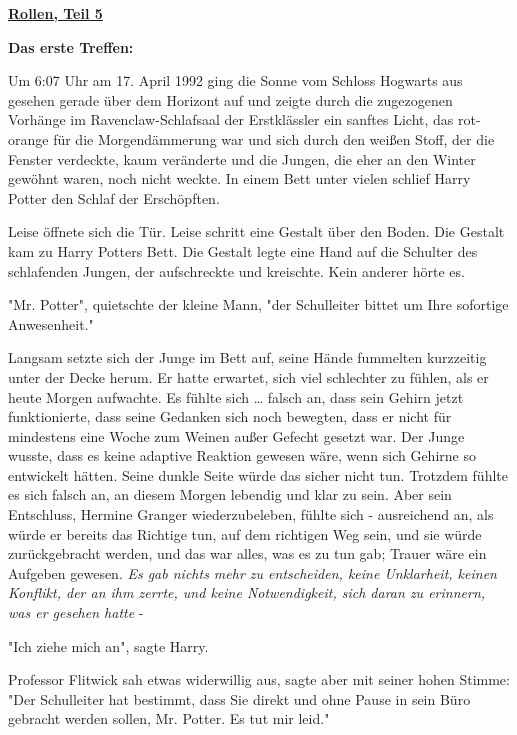 

\hypertarget{rollen-teil-5}{%

\textbf{\uline{Rollen, Teil 5}}

\textbf{Das erste Treffen:}

Um 6:07 Uhr am 17. April 1992 ging die Sonne vom Schloss Hogwarts aus gesehen gerade über dem Horizont auf und zeigte durch die zugezogenen Vorhänge im Ravenclaw-Schlafsaal der Erstklässler ein sanftes Licht, das rot-orange für die Morgendämmerung war und sich durch den weißen Stoff, der die Fenster verdeckte, kaum veränderte und die Jungen, die eher an den Winter gewöhnt waren, noch nicht weckte. In einem Bett unter vielen schlief Harry Potter den Schlaf der Erschöpften.

Leise öffnete sich die Tür. Leise schritt eine Gestalt über den Boden. Die Gestalt kam zu Harry Potters Bett. Die Gestalt legte eine Hand auf die Schulter des schlafenden Jungen, der aufschreckte und kreischte. Kein anderer hörte es.

"Mr. Potter", quietschte der kleine Mann, "der Schulleiter bittet um Ihre sofortige Anwesenheit."

Langsam setzte sich der Junge im Bett auf, seine Hände fummelten kurzzeitig unter der Decke herum. Er hatte erwartet, sich viel schlechter zu fühlen, als er heute Morgen aufwachte. Es fühlte sich … falsch an, dass sein Gehirn jetzt funktionierte, dass seine Gedanken sich noch bewegten, dass er nicht für mindestens eine Woche zum Weinen außer Gefecht gesetzt war. Der Junge wusste, dass es keine adaptive Reaktion gewesen wäre, wenn sich Gehirne so entwickelt hätten. Seine dunkle Seite würde das sicher nicht tun. Trotzdem fühlte es sich falsch an, an diesem Morgen lebendig und klar zu sein. Aber sein Entschluss, Hermine Granger wiederzubeleben, fühlte sich - ausreichend an, als würde er bereits das Richtige tun, auf dem richtigen Weg sein, und sie würde zurückgebracht werden, und das war alles, was es zu tun gab; Trauer wäre ein Aufgeben gewesen. \emph{Es gab nichts mehr zu entscheiden, keine Unklarheit, keinen Konflikt, der an ihm zerrte, und keine Notwendigkeit, sich daran zu erinnern, was er gesehen hatte} -

"Ich ziehe mich an", sagte Harry.

Professor Flitwick sah etwas widerwillig aus, sagte aber mit seiner hohen Stimme: "Der Schulleiter hat bestimmt, dass Sie direkt und ohne Pause in sein Büro gebracht werden sollen, Mr. Potter. Es tut mir leid."

}
